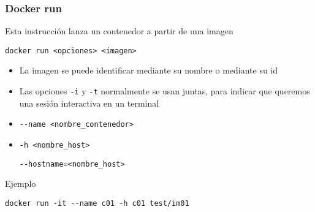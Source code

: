 \documentclass[ucs]{beamer}
\begin{document}
\begin{frame}[fragile]
\frametitle{Docker run}

Esta instrucción lanza un contenedor a partir de una imagen

\verb|docker run <opciones> <imagen>|


\begin{itemize}
\item
La imagen se puede identificar mediante su nombre o mediante su id

\item
Las opciones \verb|-i| y \verb|-t| normalmente se usan juntas, para indicar
que queremos una sesión interactiva en un terminal

\item
\verb|--name <nombre_contenedor>|


\item
\verb|-h <nombre_host>|


\verb|--hostname=<nombre_host>|


\end{itemize}

Ejemplo

  \begin{scriptsize}
  \begin{verbatim}
docker run -it --name c01 -h c01 test/im01
  \end{verbatim}
  \end{scriptsize}



\end{frame}
\end{document}
